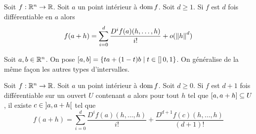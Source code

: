     \begin{theoreme}
        Soit $f : \mathbb{R}^n\to\mathbb{R}$. Soit $a$ un point intérieur à $\operatorname{dom} f$. Soit $d\geq 1$. Si $f$ est $d$ fois différentiable en $a$ alors $$f(a+h) = \sum_{i = 0}^{d} \frac{D^if(a)( h,\dotsc, h)}{i!} + o(\left\| h \right\|^d)
        $$
    \end{theoreme}
    \begin{notation}
        Soit $a,b\in \mathbb{R}^n$. On pose $\left[ a,b\right] = \{ta+(1-t)b\mid t \in\left[ \right]{0,1}\}$. On généralise de la même façon les autres types d'intervalles.
    \end{notation}
    \begin{theoreme}
        Soit $f:\mathbb{R}^n\to\mathbb{R}$. Soit $a$ un point intérieur à $\operatorname{dom} f$. Soit $d\geq 0$. Si $f$ est $d+1$ fois différentiable sur un ouvert $U$ contenant $a$ alors pour tout $h$ tel que $\left[ a,a+h\right]\subseteq U$, il existe $c\in\left] a,a+h\right[$ tel que $$f(a+h) = \sum_{i = 0}^{d} \frac{D^if(a)( h,\dotsc, h)}{i!} + \frac{D^{d+1}f(c)( h,\dotsc, h)}{(d+1)!}
         $$
    \end{theoreme}